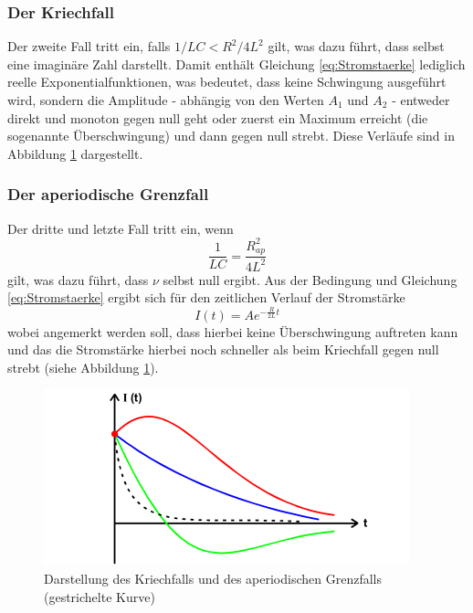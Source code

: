 \subsubsection{Der Kriechfall}

Der zweite Fall tritt ein, falls $1/LC < R^{2}/4L^{2}$ gilt, was dazu führt, 
dass \nu selbst eine imaginäre Zahl darstellt. Damit enthält Gleichung \ref{eq:Stromstaerke}
lediglich reelle Exponentialfunktionen, was bedeutet, dass keine Schwingung ausgeführt wird, 
sondern die Amplitude - abhängig von den Werten $A_1$ und $A_2$ - entweder direkt und 
monoton gegen null geht oder zuerst ein Maximum erreicht (die sogenannte Überschwingung) 
und dann gegen null strebt. Diese Verläufe sind in Abbildung \ref{fig:fvs} dargestellt.


\subsubsection{Der aperiodische Grenzfall}

Der dritte und letzte Fall tritt ein, wenn 
\begin{equation}
\frac{1}{LC} = \frac{R_{ap}^2}{4L^{2}}
\label{eq:ww}
\end{equation}
\noindent gilt, was dazu
führt, dass $\nu$ selbst null ergibt. Aus der Bedingung und Gleichung \ref{eq:Stromstaerke} ergibt
sich für den zeitlichen Verlauf der Stromstärke 
\begin{equation*}
    I(t) = A e^{-\frac{R}{2L}t}
\end{equation*}
\noindent wobei angemerkt werden soll, dass hierbei keine Überschwingung auftreten kann und 
das die Stromstärke hierbei noch schneller als beim Kriechfall gegen null strebt (siehe Abbildung \ref{fig:fvs}). 

\begin{figure}[H]
  \centering
  \includegraphics{content/faellevonschwingungen.png}
  \caption{Darstellung des Kriechfalls und des aperiodischen Grenzfalls (gestrichelte Kurve) \cite{sample354}}
  \label{fig:fvs}
\end{figure}









